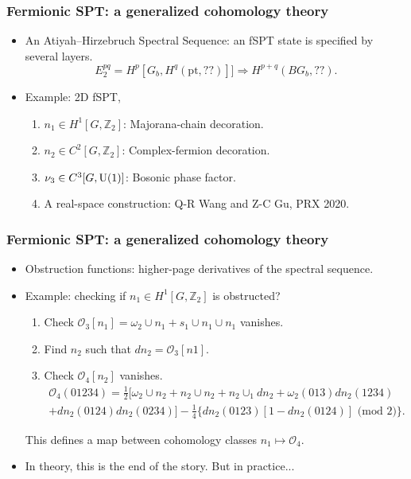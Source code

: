 \documentclass[xcolor=table, aspectratio=169,ignorenonframetext]{beamer}
\newcommand{\uone}{\text U(1)}
\begin{document}
\begin{frame}
	\frametitle{Fermionic SPT: a generalized cohomology theory}
	\begin{itemize}
        \item An Atiyah–Hirzebruch Spectral Sequence: an fSPT state is specified by several layers.
          \[E^{pq}_2=H^p[G_b, H^q(\text{pt}, ??)]]\Rightarrow H^{p+q}(BG_b, ??).\]
        \item Example: 2D fSPT,
          \begin{enumerate}
          \item $n_1\in H^1[G, \mathbb Z_2]$: Majorana-chain decoration.
          \item $n_2\in C^2[G, \mathbb Z_2]$: Complex-fermion decoration.
          \item $\nu_3\in C^3[G, \uone]$: Bosonic phase factor.
          \item A real-space construction: Q-R Wang and Z-C Gu, PRX 2020.
          \end{enumerate}
	\end{itemize}
\end{frame}

\begin{frame}
	\frametitle{Fermionic SPT: a generalized cohomology theory}
	\begin{itemize}
		\item Obstruction functions: higher-page derivatives of the spectral sequence.
		\item Example: checking if $n_1\in H^1[G, \mathbb Z_2]$ is obstructed?
		\begin{enumerate}
			\item Check $\mathcal O_3[n_1] = \omega_2\cup n_1 + s_1\cup n_1\cup n_1$ vanishes.
			\item Find $n_2$ such that $dn_2 = \mathcal O_3[n1]$.
			\item Check $\mathcal O_4[n_2]$ vanishes.
			\begin{align*}\mathcal O_4(01234) = \frac12\big[\omega_2\cup n_2 + n_2\cup n_2 + n_2 \cup_1 dn_2 + \omega_2(013)dn_2(1234)\\ + dn_2(0124)dn_2(0234)\big]
			-\frac14\big\{dn_2(0123)[1-dn_2(0124)]\text{ (mod 2)}\big\}.
		\end{align*}
		\end{enumerate}
		This defines a map between cohomology classes
		$n_1\mapsto \mathcal O_4$.
		\item In theory, this is the end of the story. But in practice...
	\end{itemize}
\end{frame}
\end{document}
